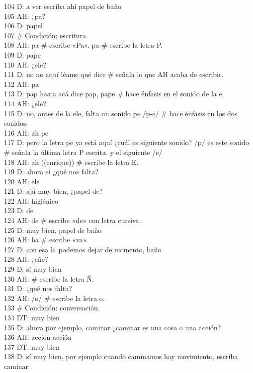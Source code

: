 104 D: a ver escriba ahí papel de baño\\
105 AH: ¿pa?\\
106 D: papel\\
107 \# Condición: escritura.\\
108 AH: pa \# escribe «Pa». pa \# escribe la letra P.\\
109 D: pape\\
110 AH: ¿ele?\\
111 D: no no aquí léame qué dice \# señala lo que AH acaba de escribir.\\
112 AH: pa\\
113 D: pap hasta acá dice pap, pape \# hace énfasis en el sonido de la e.\\
114 AH: ¿ele?\\
115 D: no, antes de la ele, falta un sonido pe /p-e/ \# hace énfasis en los dos sonidos.\\
116 AH: ah pe\\
117 D: pero la letra pe ya está aquí ¿cuál es siguiente sonido? /p/ es este sonido \# señala la última letra P escrita. y el siguiente /e/\\
118 AH: ah ((enrique)) \# escribe la letra E.\\
119 D: ahora sí ¿qué nos falta?\\
120 AH: ele\\
121 D: ajá muy bien, ¿papel de?\\
122 AH: higiénico\\
123 D: de\\
124 AH: de \# escribe «de» con letra cursiva.\\
125 D: muy bien, papel de baño\\
126 AH: ba \# escribe «va».\\
127 D: con esa la podemos dejar de momento, baño\\
128 AH: ¿eñe?\\
129 D: sí muy bien\\
130 AH: \# escribe la letra Ñ.\\
131 D: ¿qué nos falta?\\
132 AH: /o/ \# escribe la letra o.\\
133 \# Condición: conversación.\\
134 DT: muy bien\\
135 D: ahora por ejemplo, caminar ¿caminar es una cosa o una acción?\\
136 AH: acción acción\\
137 DT: muy bien\\
138 D: sí muy bien, por ejemplo cuando caminamos hay movimiento, escriba caminar\\
